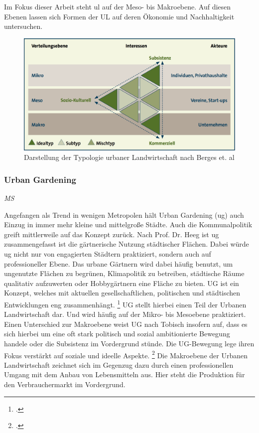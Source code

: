 \documentclass{scrartcl}
\begin{document}
Im Fokus dieser Arbeit steht \acs{ul} auf der Meso- bis Makroebene. Auf diesen Ebenen lassen sich Formen der UL auf deren Ökonomie und Nachhaltigkeit untersuchen.

\begin{figure}[htbp]
\centering
\includegraphics[width=12cm]{image_folder/ul_typologie.png}
\caption{Darstellung der Typologie urbaner Landwirtschaft nach Berges et. al}
\label{fig:ul_typologie}
\end{figure}

\subsubsection{Urban Gardening} \label{UG}
\textit{MS}

Angefangen als Trend in wenigen Metropolen hält Urban Gardening (\acs{ug}) auch Einzug in immer mehr kleine und mittelgroße Städte. Auch die Kommunalpolitik greift mittlerweile auf das Konzept zurück. Nach Prof. Dr. Heeg ist \acs{ug} zusammengefasst ist die gärtnerische Nutzung städtischer Flächen. Dabei würde \acs{ug} nicht nur von engagierten Städtern praktiziert, sondern auch auf professioneller Ebene. Das urbane Gärtnern wird dabei häufig benutzt, um ungenutzte Flächen zu begrünen, Klimapolitik zu betreiben, städtische Räume qualitativ aufzuwerten oder Hobbygärtnern eine Fläche zu bieten. UG ist ein Konzept, welches mit aktuellen gesellschaftlichen, politischen und städtischen Entwicklungen eng zusammenhängt. \footcite[Vgl.][Geleitwort von Prof. Dr. Susanne Heeg f]{Biedermann2017UrbanStadtentwicklung}
UG stellt hierbei einen Teil der Urbanen Landwirtschaft dar. Und wird häufig auf der Mikro- bis Mesoebene praktiziert. Einen Unterschied zur Makroebene weist UG nach Tobisch insofern auf, dass es sich hierbei um eine oft stark politisch und sozial ambitionierte Bewegung handele oder die Subsistenz im Vordergrund stünde. Die UG-Bewegung lege ihren Fokus verstärkt auf soziale und ideelle Aspekte. \footcite[Vgl.][S.25-27]{CarlosTobisch2012OasenBrachflachen} Die Makroebene der Urbanen Landwirtschaft zeichnet sich im Gegenzug dazu durch einen professionellen Umgang mit dem Anbau von Lebensmitteln aus. Hier steht die Produktion für den Verbrauchermarkt im Vordergrund.
\end{document}
